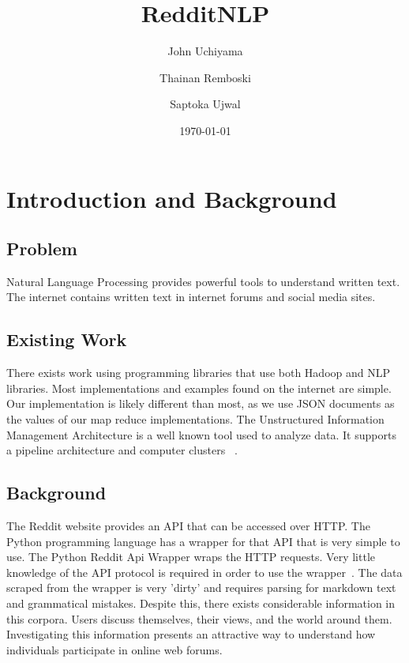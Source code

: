 \documentclass[12pt,a4paper]{article}
\begin{document}
\lstset{breaklines=true}

\title{RedditNLP}
\author{John Uchiyama \and Thainan Remboski \and Saptoka Ujwal}
\date{\today}
\maketitle

\tableofcontents

\newpage

\section{Introduction and Background}

\subsection{Problem}

Natural Language Processing \cite{nlp} provides
powerful tools to understand written text. The internet
contains written text in internet forums and social 
media sites. 


\subsection{Existing Work}

There exists work using programming libraries that
use both Hadoop and NLP libraries. Most implementations
and examples found on the internet are simple. Our implementation
is likely different than most, as we use JSON documents
as the values of our map reduce implementations. The
Unstructured Information Management Architecture is a
well known tool used to analyze data. It supports a pipeline
architecture and computer clusters ~\cite{UIMA}.

\subsection{Background}

The Reddit website provides an API that can be accessed
over HTTP. The Python programming language has a wrapper
for that API that is very simple to use. The Python 
Reddit Api Wrapper wraps the HTTP requests. 
Very little knowledge of the API protocol is required in order to use the wrapper~\cite{PRAW}.
The data scraped from the wrapper is very 'dirty' and requires parsing for markdown text and grammatical mistakes.
Despite this, there exists considerable information in this
corpora. Users discuss themselves, their views, and the world
around them. Investigating this information presents
an attractive way to understand how individuals participate
in online web forums.
\end{document}
